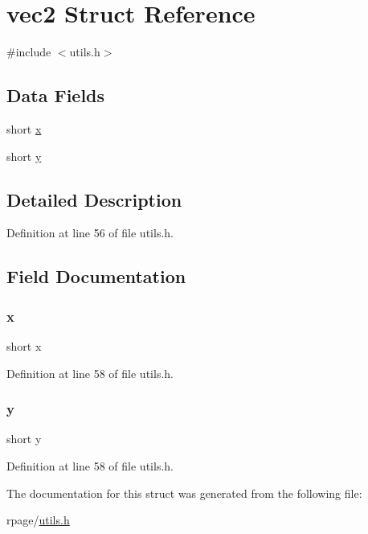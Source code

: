 \hypertarget{structvec2}{}\section{vec2 Struct Reference}
\label{structvec2}


{\ttfamily \#include $<$utils.\+h$>$}

\subsection*{Data Fields}
\begin{DoxyCompactItemize}
\item 
short \mbox{\hyperlink{structvec2_ad34729e4edc23ac502eaa17b188df67b}{x}}
\item 
short \mbox{\hyperlink{structvec2_a34769302b056076dd9f0cd95de8c5d2f}{y}}
\end{DoxyCompactItemize}


\subsection{Detailed Description}


Definition at line 56 of file utils.\+h.



\subsection{Field Documentation}
\mbox{\label{structvec2_ad34729e4edc23ac502eaa17b188df67b}} 
\subsubsection{\texorpdfstring{x}{x}}
{\footnotesize\ttfamily short x}



Definition at line 58 of file utils.\+h.

\mbox{\label{structvec2_a34769302b056076dd9f0cd95de8c5d2f}} 
\subsubsection{\texorpdfstring{y}{y}}
{\footnotesize\ttfamily short y}



Definition at line 58 of file utils.\+h.



The documentation for this struct was generated from the following file\+:\begin{DoxyCompactItemize}
\item 
rpage/\mbox{\hyperlink{utils_8h}{utils.\+h}}\end{DoxyCompactItemize}
